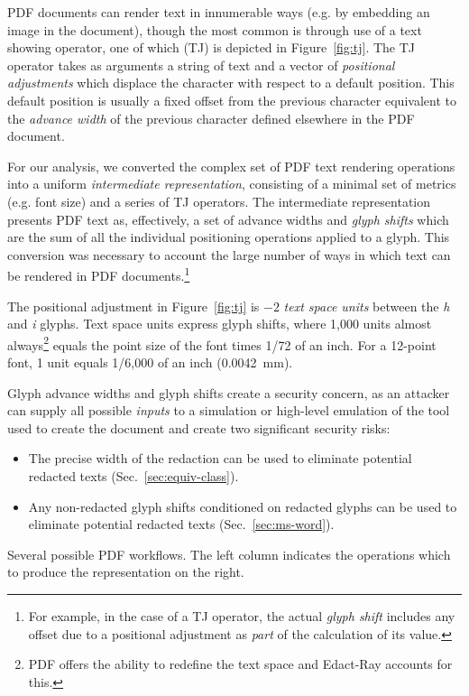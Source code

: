 PDF documents can render text in innumerable ways (e.g. by embedding an image in the document), though the most common is through use of a text showing operator, one of which (TJ) is depicted in Figure~\ref{fig:tj}.
The TJ operator takes as arguments a string of text and a vector of \emph{positional adjustments} which displace the character with respect to a default position.
This default position is usually a fixed offset from the previous character equivalent to the \emph{advance width} of the previous character defined elsewhere in the PDF document.

For our analysis, we converted the complex set of PDF text rendering operations into a uniform \emph{intermediate representation}, consisting of a minimal set of metrics (e.g. font size) and a series of TJ operators.
The intermediate representation presents PDF text as, effectively, a set of advance widths and \emph{glyph shifts} which are the sum of all the individual positioning operations applied to a glyph.
This conversion was necessary to account the large number of ways in which text can be rendered in PDF documents.\footnote{For example, in the case of a TJ operator, the actual \emph{glyph shift} includes any offset due to a positional adjustment as \emph{part} of the calculation of its value.}

The positional adjustment in Figure~\ref{fig:tj} is $-2$ \emph{text space units} between the \emph{h} and \emph{i} glyphs.
Text space units express glyph shifts, where 1,000 units almost always\footnote{PDF offers the ability to redefine the text space and Edact-Ray accounts for this.} equals the point size of the font times 1/72 of an inch.
For a 12-point font, 1 unit equals 1/6,000 of an inch (0.0042~mm).

Glyph advance widths and glyph shifts create a security concern, as an attacker can supply all possible \emph{inputs} to a simulation or high-level emulation of the tool used to create the document and create two significant security risks:

\begin{itemize}
    \item The precise width of the redaction can be used to eliminate potential redacted texts (Sec.~\ref{sec:equiv-class}).
    \item Any non-redacted glyph shifts conditioned on redacted glyphs can be used to eliminate potential redacted texts (Sec.~\ref{sec:ms-word}).
\end{itemize}

\begin{table}
  \small
  \centering
  \caption{Several possible PDF workflows. The left column indicates the operations which to produce the representation on the right.}
  \label{tab:flows}
  
\end{table}

